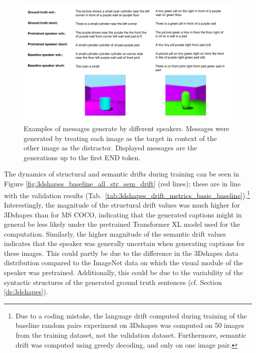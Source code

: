 \begin{figure}[h]
	\centering
	\includegraphics[width=\linewidth]{images/example_generations/shapes_randomPairs.pdf}
	\caption{Examples of messages generate by different speakers. Messages were generated by treating each image as the target in context of the other image as the distractor. Displayed messages are the generations up to the first END token.}
	\label{fig:shapes_randPairs_speaker_generations}
\end{figure}
 
The dynamics of structural and semantic drifts during training can be seen in Figure \ref{fig:3dshapes_baseline_all_str_sem_drift} (red lines); these are in line with the validation results (Tab.~\ref{tab:3dshapes_drift_metrics_basic_baseline}).\footnote{Due to a coding mistake, the language drift computed during training of the baseline random pairs experiment on 3Dshapes was computed on 50 images from the training dataset, not the validation dataset. Furthermore, semantic drift was computed using greedy decoding, and only on one image pair.} 
Interestingly, the magnitude of the structural drift values was much higher for 3Dshapes than for MS COCO, indicating that the generated captions might in general be less likely under the pretrained Transformer XL model used for the computation. Similarly, the higher magnitude of the semantic drift values indicates that the speaker was generally uncertain when generating captions for these images. This could partly be due to the difference in the 3Dshapes data distribution compared to the ImageNet data on which the visual module of the speaker was pretrained. Additionally, this could be due to the variability of the syntactic structures of the generated ground truth sentences (cf. Section \ref{ds:3dshapes}). 

